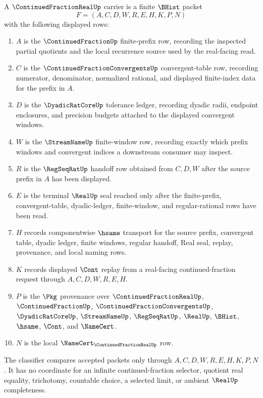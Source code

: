 \begin{definition}
\label{def:continued-fraction-real-carrier}
A $\ContinuedFractionRealUp$ carrier is a finite $\BHist$ packet
$$
F=(A,C,D,W,R,E,H,K,P,N)
$$
with the following displayed rows:
\begin{enumerate}
\item $A$ is the $\ContinuedFractionUp$ finite-prefix row, recording the inspected partial quotients and the local recurrence source used by the real-facing read.
\item $C$ is the $\ContinuedFractionConvergentsUp$ convergent-table row, recording numerator, denominator, normalized rational, and displayed finite-index data for the prefix in $A$.
\item $D$ is the $\DyadicRatCoreUp$ tolerance ledger, recording dyadic radii, endpoint enclosures, and precision budgets attached to the displayed convergent windows.
\item $W$ is the $\StreamNameUp$ finite-window row, recording exactly which prefix windows and convergent indices a downstream consumer may inspect.
\item $R$ is the $\RegSeqRatUp$ handoff row obtained from $C,D,W$ after the source prefix in $A$ has been displayed.
\item $E$ is the terminal $\RealUp$ seal reached only after the finite-prefix, convergent-table, dyadic-ledger, finite-window, and regular-rational rows have been read.
\item $H$ records componentwise $\hsame$ transport for the source prefix, convergent table, dyadic ledger, finite windows, regular handoff, Real seal, replay, provenance, and local naming rows.
\item $K$ records displayed $\Cont$ replay from a real-facing continued-fraction request through $A,C,D,W,R,E,H$.
\item $P$ is the $\Pkg$ provenance over $\ContinuedFractionRealUp$, $\ContinuedFractionUp$, $\ContinuedFractionConvergentsUp$, $\DyadicRatCoreUp$, $\StreamNameUp$, $\RegSeqRatUp$, $\RealUp$, $\BHist$, $\hsame$, $\Cont$, and $\NameCert$.
\item $N$ is the local $\NameCert_{\ContinuedFractionRealUp}$ row.
\end{enumerate}
The classifier compares accepted packets only through $A,C,D,W,R,E,H,K,P,N$. It has no coordinate for an infinite continued-fraction selector, quotient real equality, trichotomy, countable choice, a selected limit, or ambient $\RealUp$ completeness.
\end{definition}

